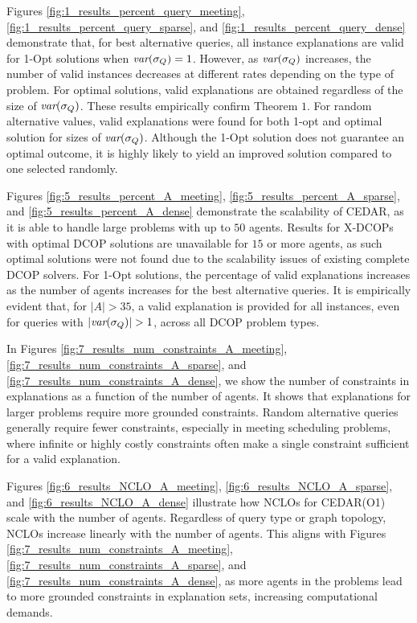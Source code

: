 \documentclass[twoside,11pt]{article}
\begin{document}
Figures \ref{fig:1_results_percent_query_meeting}, \ref{fig:1_results_percent_query_sparse}, and \ref{fig:1_results_percent_query_dense} demonstrate that, for best alternative queries, all instance explanations are valid for 1-Opt solutions when ${\textit{var}(\sigma_Q)} = 1$. However, as ${\textit{var}(\sigma_Q)}$ increases, the number of valid instances decreases at different rates depending on the type of problem. For optimal solutions, valid explanations are obtained regardless of the size of ${\textit{var}(\sigma_Q)}$. These results empirically confirm Theorem $1$. For random alternative values, valid explanations were found for both 1-opt and optimal solution for sizes of ${\textit{var}(\sigma_Q)}$. Although the 1-Opt solution does not guarantee an optimal outcome, it is highly likely to yield an improved solution compared to one selected randomly.

Figures \ref{fig:5_results_percent_A_meeting}, \ref{fig:5_results_percent_A_sparse}, and \ref{fig:5_results_percent_A_dense} demonstrate the scalability of CEDAR, as it is able to handle large problems with up to $50$ agents. Results for X-DCOPs with optimal DCOP solutions are unavailable for $15$ or more agents, as such optimal solutions were not found due to the scalability issues of existing complete DCOP solvers. For 1-Opt solutions, the percentage of valid explanations increases as the number of agents increases for the best alternative queries. It is empirically evident that, for $|A| > 35$, a valid explanation is provided for all instances, even for queries with $|{\textit{var}(\sigma_Q)}| > 1$, across all DCOP problem types.


In Figures \ref{fig:7_results_num_constraints_A_meeting}, \ref{fig:7_results_num_constraints_A_sparse}, and \ref{fig:7_results_num_constraints_A_dense}, we show the number of constraints in explanations as a function of the number of agents. It shows that explanations for larger problems require more grounded constraints. Random alternative queries generally require fewer constraints, especially in meeting scheduling problems, where infinite or highly costly constraints often make a single constraint sufficient for a valid explanation. 


Figures \ref{fig:6_results_NCLO_A_meeting}, \ref{fig:6_results_NCLO_A_sparse}, and \ref{fig:6_results_NCLO_A_dense} illustrate how NCLOs for CEDAR(O1) scale with the number of agents. Regardless of query type or graph topology, NCLOs increase linearly with the number of agents. This aligns with Figures \ref{fig:7_results_num_constraints_A_meeting}, \ref{fig:7_results_num_constraints_A_sparse}, and \ref{fig:7_results_num_constraints_A_dense}, as more agents in the problems lead to more grounded constraints in explanation sets, increasing computational demands.
\end{document}
